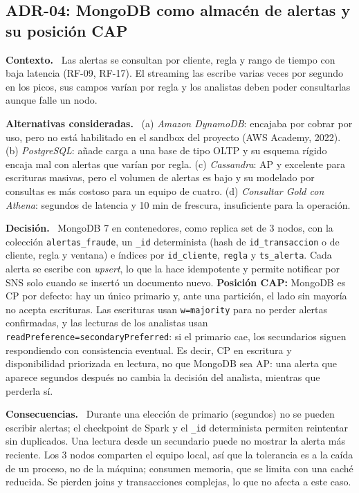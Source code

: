 \documentclass[12pt,letterpaper]{article}
\newcommand{\code}[1]{{\small\texttt{#1}}}
\newcommand{\adrpart}[1]{\textbf{#1.}~}
\begin{document}
\subsection*{ADR-04: MongoDB como almacén de alertas y su posición CAP}

\adrpart{Contexto} Las alertas se consultan por cliente, regla y rango de tiempo con baja latencia (RF-09, RF-17). El streaming las escribe varias veces por segundo en los picos, sus campos varían por regla y los analistas deben poder consultarlas aunque falle un nodo.

\adrpart{Alternativas consideradas} (a) \emph{Amazon DynamoDB}: encajaba por cobrar por uso, pero no está habilitado en el sandbox del proyecto (AWS Academy, 2022). (b) \emph{PostgreSQL}: añade carga a una base de tipo OLTP y su esquema rígido encaja mal con alertas que varían por regla. (c) \emph{Cassandra}: AP y excelente para escrituras masivas, pero el volumen de alertas es bajo y su modelado por consultas es más costoso para un equipo de cuatro. (d) \emph{Consultar Gold con Athena}: segundos de latencia y 10 min de frescura, insuficiente para la operación.

\adrpart{Decisión} MongoDB 7 en contenedores, como replica set de 3 nodos, con la colección \code{alertas\_fraude}, un \code{\_id} determinista (hash de \code{id\_transaccion} o de cliente, regla y ventana) e índices por \code{id\_cliente}, \code{regla} y \code{ts\_alerta}. Cada alerta se escribe con \emph{upsert}, lo que la hace idempotente y permite notificar por SNS solo cuando se insertó un documento nuevo. \textbf{Posición CAP:} MongoDB es CP por defecto: hay un único primario y, ante una partición, el lado sin mayoría no acepta escrituras. Las escrituras usan \code{w=majority} para no perder alertas confirmadas, y las lecturas de los analistas usan \code{readPreference=secondaryPreferred}: si el primario cae, los secundarios siguen respondiendo con consistencia eventual. Es decir, CP en escritura y disponibilidad priorizada en lectura, no que MongoDB sea AP: una alerta que aparece segundos después no cambia la decisión del analista, mientras que perderla sí.

\adrpart{Consecuencias} Durante una elección de primario (segundos) no se pueden escribir alertas; el checkpoint de Spark y el \code{\_id} determinista permiten reintentar sin duplicados. Una lectura desde un secundario puede no mostrar la alerta más reciente. Los 3 nodos comparten el equipo local, así que la tolerancia es a la caída de un proceso, no de la máquina; consumen memoria, que se limita con una caché reducida. Se pierden joins y transacciones complejas, lo que no afecta a este caso.
\end{document}
